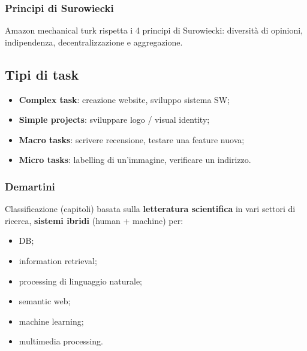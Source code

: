 \documentclass{article}
\begin{document}
    \subsubsection{Principi di Surowiecki}
      Amazon mechanical turk rispetta i 4 principi di Surowiecki: diversità di opinioni, indipendenza, decentralizzazione e aggregazione.
  \subsection{Tipi di task}
    \begin{itemize}
        \item \textbf{Complex task}: creazione website, sviluppo sistema SW;
        \item \textbf{Simple projects}: sviluppare logo / visual identity;
        \item \textbf{Macro tasks}: scrivere recensione, testare una feature nuova;
        \item \textbf{Micro tasks}: labelling di un'immagine, verificare un indirizzo.
    \end{itemize}
    \subsubsection{Demartini}
      Classificazione (capitoli) basata sulla \textbf{letteratura scientifica} in vari settori di ricerca, \textbf{sistemi ibridi} (human + machine) per:
      \begin{itemize}
          \item DB;
          \item information retrieval;
          \item processing di linguaggio naturale;
          \item semantic web;
          \item machine learning;
          \item multimedia processing.
      \end{itemize}
\end{document}

